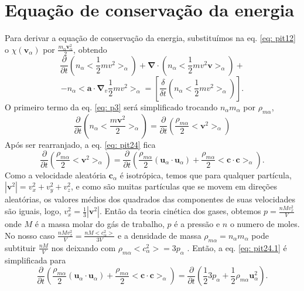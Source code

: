 \documentclass[12pt,oneside,a4paper]{abntex2}
\begin{document}
\section{Equação de conservação da energia}
\noindent  Para derivar a equação de conservação da energia, substituímos na eq. \ref{eq: pit12} o $\chi (\bm{v}_\alpha)$ por $\frac{m_\alpha \bm{v}^2_\alpha}{2}$, obtendo
\begin{equation}
\label{eq: p3}
\frac{\partial }{\partial t}(n_\alpha<\frac{1}{2}m v^2>_\alpha) + \bm{\nabla} \cdot (n_\alpha<\frac{1}{2}m v^2 \bm{v} >_\alpha) +
\end{equation}
\begin{equation*}
- n_\alpha<\bm{a} \cdot \bm{\nabla}_v \frac{1}{2}m v^2>_\alpha = [\frac{\delta}{\delta t}(n_\alpha<\frac{1}{2}m v^2>_\alpha)] .
\end{equation*}
O primeiro termo da eq. \ref{eq: p3} será simplificado trocando $ n_\alpha m_\alpha$ por $\rho_{m\alpha}$, 
\begin{equation}
\label{eq: pit24}
\frac{\partial }{\partial t}(n_\alpha<\frac{m \bm{v}^2}{2}>_\alpha)=\frac{\partial }{\partial t}(\frac{\rho_{m\alpha}}{2}<\bm{v}^2>_\alpha)
\end{equation}
Após ser rearranjado, a eq. \ref{eq: pit24} fica
\begin{equation}
\label{eq: pit24.1}
\frac{\partial }{\partial t}(\frac{\rho_{m\alpha}}{2}<\bm{v}^2>_\alpha)=\frac{\partial }{\partial t}(\frac{\rho_{m\alpha}}{2}(\bm{u}_\alpha \cdot \bm{u}_\alpha) + \frac{\rho_{m\alpha}}{2}<\bm{c} \cdot \bm{c}>_\alpha) .
\end{equation} 
Como a velocidade aleatória $\bm{c}_\alpha$ é isotrópica, temos que para qualquer partícula, $|\bm{v}^2| = v_x^2 + v_y^2 + v_z^2$, e como são muitas partículas que se movem em direções aleatórias, os valores médios dos quadrados das componentes de suas velocidades são iguais, logo, $v_x^2 = \frac{1}{3} |\bm{v}^2|$. Então da teoria cinética dos gases, obtemos $p=\frac{nMv_x^2}{V}$ onde $M$ é a massa molar do gás de trabalho, $p$ é a pressão e $n$ o numero de moles. No nosso caso $\frac{nMv_x^2}{V} = \frac{nM <c^2_\alpha>}{3V} $ e a densidade de massa $ \rho_{m\alpha} = n_\alpha m_\alpha$ pode subtituir $\frac{nM}{V}$ nos deixando com $\rho_{m\alpha}<c^2_\alpha>=3p_\alpha$ \cite[pg. 152]{bittencourt}. 
Então, a eq. \ref{eq: pit24.1} é simplificada para 
\begin{equation}
\label{eq: pit24.12}
\frac{\partial }{\partial t}(\frac{\rho_{m\alpha}}{2}(\bm{u}_\alpha \cdot \bm{u}_\alpha) + \frac{\rho_{m\alpha}}{2}<\bm{c} \cdot \bm{c}>_\alpha)=\frac{\partial }{\partial t}  \left( \frac{1}{2} 3p_\alpha+\frac{1}{2} \rho_{m\alpha}\bm{u}^2_\alpha \right) .
\end{equation} 
\end{document}
